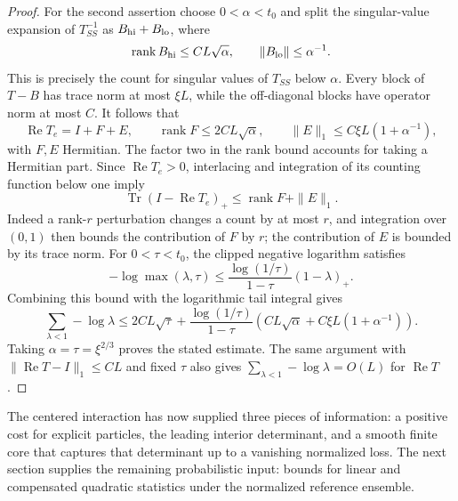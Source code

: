 \begin{proof}
For the second assertion choose \(0<\alpha<t_0\) and split the
singular-value expansion of \(T_{SS}^{-1}\) as \(B_{\rm hi}+B_{\rm lo}\),
where
\[
 \operatorname{rank}B_{\rm hi}\le CL\sqrt\alpha,
 \qquad \|B_{\rm lo}\|\le\alpha^{-1}.
\]
This is precisely the count for singular values of \(T_{SS}\) below
\(\alpha\). Every block of \(T-B\) has trace norm at most \(\xi L\),
while the off-diagonal blocks have operator norm at most \(C\).
It follows that
\[
 \operatorname{Re}T_e=I+F+E,\qquad
 \operatorname{rank}F\le2CL\sqrt\alpha,
 \qquad \|E\|_1\le C\xi L(1+\alpha^{-1}),
\]
with \(F,E\) Hermitian. The factor two in the rank bound accounts for
taking a Hermitian part. Since \(\operatorname{Re}T_e>0\), interlacing
and integration of its counting function below one imply
\[
 \operatorname{Tr}(I-\operatorname{Re}T_e)_+
       \le\operatorname{rank}F+\|E\|_1.
\]
Indeed a rank-\(r\) perturbation changes a count by at most \(r\), and
integration over \((0,1)\) then bounds the contribution of \(F\) by
\(r\); the contribution of \(E\) is bounded by its trace norm.
For \(0<\tau<t_0\), the clipped negative logarithm satisfies
\[
 -\log\max(\lambda,\tau)
 \le\frac{\log(1/\tau)}{1-\tau}(1-\lambda)_+.
\]
Combining this bound with the logarithmic tail integral gives
\[
 \sum_{\lambda<1}-\log\lambda
 \le2CL\sqrt\tau+
   \frac{\log(1/\tau)}{1-\tau}
   \left(CL\sqrt\alpha+C\xi L(1+\alpha^{-1})\right).
\]
Taking \(\alpha=\tau=\xi^{2/3}\) proves the stated estimate. The same
argument with \(\|\operatorname{Re}T-I\|_1\le CL\) and fixed \(\tau\)
also gives \(\sum_{\lambda<1}-\log\lambda=O(L)\) for
\(\operatorname{Re}T\).
\end{proof}


The centered interaction has now supplied three pieces of information:
a positive cost for explicit particles, the leading interior determinant,
and a smooth finite core that captures that determinant up to a
vanishing normalized loss. The next section supplies the remaining
probabilistic input: bounds for linear and compensated quadratic
statistics under the normalized reference ensemble.
